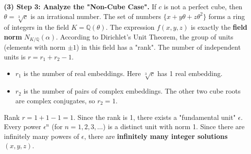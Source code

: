 \begin{solution}
\textbf{(3) Step 3: Analyze the "Non-Cube Case".}
If $c$ is not a perfect cube, then $\theta = \sqrt[3]{c}$ is an irrational number. The set of numbers $\{ x + y\theta + z\theta^2 \}$ forms a ring of integers in the field $K = \mathbb{Q}(\theta)$.
The expression $f(x, y, z)$ is exactly the \textbf{field norm} $N_{K/\mathbb{Q}}(\alpha)$.
According to Dirichlet's Unit Theorem, the group of units (elements with norm $\pm 1$) in this field has a "rank".
The number of independent units is $r = r_1 + r_2 - 1$.
\begin{itemize}
    \item $r_1$ is the number of real embeddings. Here $\sqrt[3]{c}$ has 1 real embedding.
    \item $r_2$ is the number of pairs of complex embeddings. The other two cube roots are complex conjugates, so $r_2 = 1$.
\end{itemize}
Rank $r = 1 + 1 - 1 = 1$.
Since the rank is 1, there exists a "fundamental unit" $\epsilon$. Every power $\epsilon^n$ (for $n=1, 2, 3, \dots$) is a distinct unit with norm 1.
Since there are infinitely many powers of $\epsilon$, there are \textbf{infinitely many integer solutions} $(x, y, z)$.
\end{solution}
